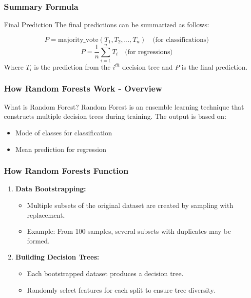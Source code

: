 \documentclass[aspectratio=169]{beamer}
\begin{document}
\begin{frame}[fragile]
    \frametitle{Summary Formula}
    \begin{block}{Final Prediction}
        The final predictions can be summarized as follows:
    \end{block}
    \begin{equation}
        P = \text{majority\_vote}(T_1, T_2, ..., T_n) \quad \text{(for classifications)}
    \end{equation}
    \begin{equation}
        P = \frac{1}{n} \sum_{i=1}^{n} T_i \quad \text{(for regressions)}
    \end{equation}
    Where \(T_i\) is the prediction from the \(i^{th}\) decision tree and \(P\) is the final prediction.
\end{frame}

\begin{frame}[fragile]
    \frametitle{How Random Forests Work - Overview}
    \begin{block}{What is Random Forest?}
        Random Forest is an ensemble learning technique that constructs multiple decision trees during training. The output is based on:
        \begin{itemize}
            \item Mode of classes for classification
            \item Mean prediction for regression
        \end{itemize}
    \end{block}
\end{frame}

\begin{frame}[fragile]
    \frametitle{How Random Forests Function}
    \begin{enumerate}
        \item \textbf{Data Bootstrapping:} 
        \begin{itemize}
            \item Multiple subsets of the original dataset are created by sampling with replacement.
            \item Example: From 100 samples, several subsets with duplicates may be formed.
        \end{itemize}
        
        \item \textbf{Building Decision Trees:}
        \begin{itemize}
            \item Each bootstrapped dataset produces a decision tree.
            \item Randomly select features for each split to ensure tree diversity.
        \end{itemize}
    \end{enumerate}
\end{frame}
\end{document}
